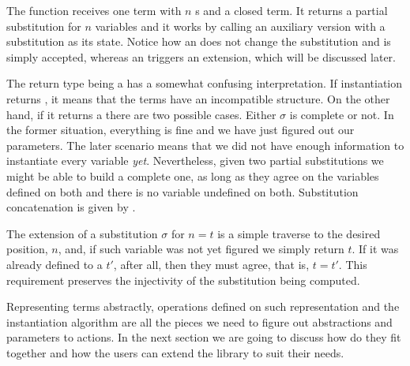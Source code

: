 
The  function receives one term with $n$ s and a closed term. It returns a partial substitution for $n$ variables and it works by calling an auxiliary version with a substitution as its state. Notice how an  does not change the substitution and is simply accepted, whereas an  triggers an extension, which will be discussed later.

The return type being a  has a somewhat confusing interpretation. If instantiation returns , it means that the terms have an incompatible structure. On the other hand, if it returns a  there are two possible cases. Either $\sigma$ is complete or not. In the former situation, everything is fine and we have just figured out our parameters. The later scenario means that we did not have enough information to instantiate every variable \emph{yet}. Nevertheless, given two partial substitutions we might be able to build a complete one, as long as they agree on the variables defined on both and there is no variable undefined on both. Substitution concatenation is given by .


The extension of a substitution $\sigma$ for $n = t$ is a simple traverse to the desired position, $n$, and, if such variable was not yet figured we simply return $t$. If it was already defined to a $t'$, after all, then they must agree, that is, $t = t'$. This requirement preserves the injectivity of
the substitution being computed. 


Representing terms abstractly, operations defined on such representation and
the instantiation algorithm are all the pieces we need to figure out abstractions and parameters to actions. In the next section we are going to
discuss how do they fit together and how the users can extend the library
to suit their needs.
 
